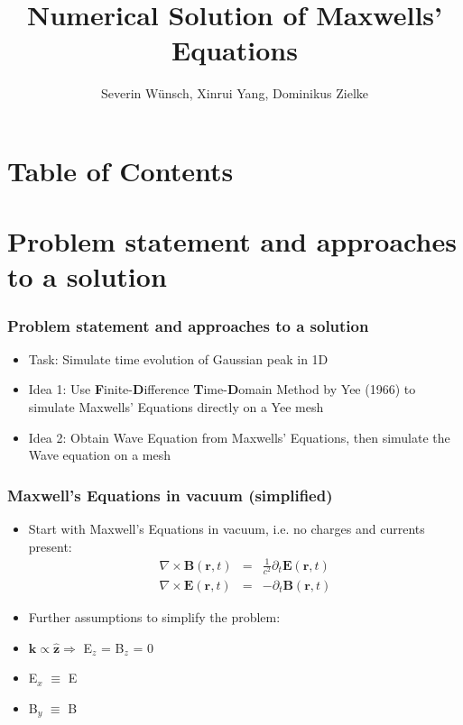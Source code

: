 \documentclass[ignorenonframetext]{beamer}
\title[]{Numerical Solution of Maxwells' Equations}
\subtitle{}
\author[Wünsch, Yang, Zielke]{\large{Severin Wünsch, Xinrui Yang, Dominikus Zielke} \\
}
\institute[Universität Augsburg]{Institut für Physik der Universität Augsburg}
\date[29.07.2016]
\begin{document}
\frame[plain]{\titlepage}

\section*{Table of Contents}
\begin{frame}
\tableofcontents[]
\end{frame}

\section{Problem statement and approaches to a solution}
\begin{frame}
\frametitle{Problem statement and approaches to a solution}
\begin{itemize}
\item Task: Simulate time evolution of Gaussian peak in 1D
\begin{figure}
\centering
\label{fig:yee_mesh}
\end{figure}
\item Idea 1: Use \textbf{F}inite-\textbf{D}ifference \textbf{T}ime-\textbf{D}omain Method by Yee (1966) to simulate Maxwells' Equations directly on a Yee mesh
\item Idea 2: Obtain Wave Equation from Maxwells' Equations, then simulate the Wave equation on a mesh
\end{itemize}
\end{frame}

\begin{frame}
\frametitle{Maxwell's Equations in vacuum (simplified)}
\begin{itemize}
\item Start with Maxwell's Equations in vacuum, i.e. no charges and currents present:
\begin{eqnarray}
\nabla \times \boldsymbol{B}(\boldsymbol{r},t) &=& \frac{1}{c^2}\partial_t{\boldsymbol{E}}(\boldsymbol{r},t)\nonumber\\
\nabla \times \boldsymbol{E}(\boldsymbol{r},t) &=& -\partial_t{\boldsymbol{B}}(\boldsymbol{r}, t)
\end{eqnarray}
\item Further assumptions to simplify the problem:
\item $\boldsymbol{k} \propto \hat{\boldsymbol{z}} \Rightarrow $ E$_z$ = B$_z$ = 0   
\item E$_x$ $\equiv$ E 
\item B$_y$ $\equiv$ B
\end{itemize}
\end{frame}
\end{document}
